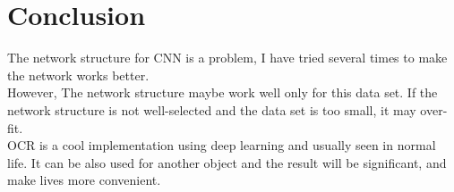\chapter{Conclusion}
\indent\indent
	The network structure for CNN is a problem, I have tried several times to make the network works better. \\
	However, The network structure maybe work well only for this data set. 
	If the network structure is not well-selected and the data set is too small, it may over-fit. \\
	OCR is a cool implementation using deep learning and usually seen in normal life. It can be also used for another object and the result will be significant, 
	and make lives more convenient.
	

